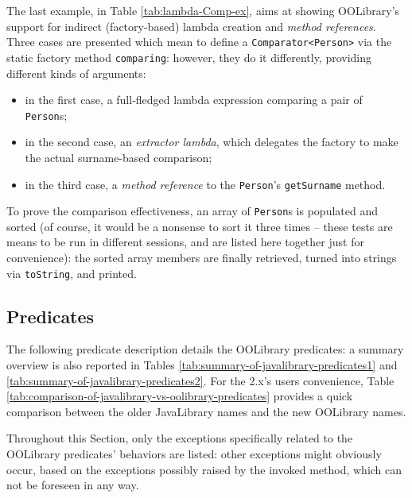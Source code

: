 The last example, in Table \ref{tab:lambda-Comp-ex}, aims at showing OOLibrary's support for indirect (factory-based) lambda creation and \textit{method references}.
Three cases are presented which mean to define a \texttt{Comparator<Person>} via the static factory method \texttt{comparing}: however, they do it differently, providing different kinds of arguments:
\begin{itemize}
 \item in the first case, a full-fledged lambda expression comparing a pair of \texttt{Person}s;
 \item in the second case, an \textit{extractor lambda}, which delegates the factory to make the actual surname-based comparison;
 \item in the third case, a \textit{method reference} to the \texttt{Person}'s \texttt{getSurname} method.
\end{itemize}
\noindent To prove the comparison effectiveness, an array of \texttt{Person}s is populated and sorted (of course, it would be a nonsense to sort it three times -- these tests are means to be run in different sessions, and are listed here together just for convenience): the sorted array members are finally retrieved, turned into strings via \texttt{toString}, and printed.

\subsection{Predicates}
\label{ssec:all-javalibrary-predicates}

The following predicate description details the OOLibrary predicates: a summary overview is also reported in Tables \ref{tab:summary-of-javalibrary-predicates1} and \ref{tab:summary-of-javalibrary-predicates2}.
For the \tuprolog{} 2.x's users convenience, Table \ref{tab:comparison-of-javalibrary-vs-oolibrary-predicates}
provides a quick comparison between the older JavaLibrary names and the new OOLibrary names.

Throughout this Section, only the exceptions specifically related to the OOLibrary predicates' behaviors are listed: other exceptions might obviously occur, based on the exceptions possibly raised by the invoked method, which can not be foreseen in any way.

